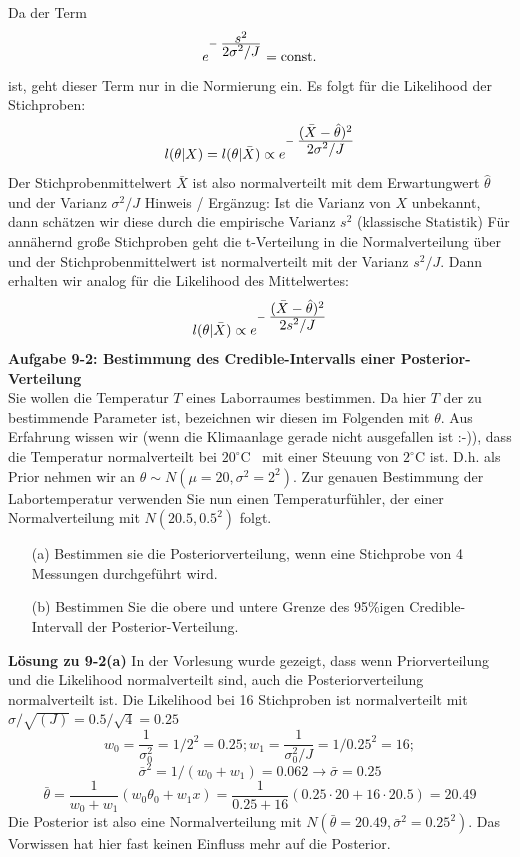 Da der Term
\[e^{-\;\frac{\textstyle s^2 }
	{\textstyle 2 \sigma^2/J}} = \mathrm{const.}
\]
ist, geht dieser Term nur in die Normierung ein.
Es folgt für die Likelihood der Stichproben:
\[
l(\theta|X) = l(\theta|\bar{X}) \propto e^{-\;\frac{\textstyle (\bar{X} - \hat{\theta})^2}
	{\textstyle 2 \sigma^2/J}}
\]
Der Stichprobenmittelwert $\bar{X}$ ist also normalverteilt mit dem
Erwartungwert $\hat{\theta}$ und der Varianz $\sigma^2 /J$
Hinweis / Ergänzug: Ist die Varianz von $X$ unbekannt, dann schätzen wir diese durch die empirische Varianz $s^2$ (klassische Statistik) Für annähernd große Stichproben geht die t-Verteilung in
die Normalverteilung über und der Stichprobenmittelwert ist normalverteilt mit der Varianz $s^2/J$. Dann erhalten wir analog für die Likelihood des Mittelwertes:
\[
l(\theta|\bar{X}) \propto e^{-\;\frac{\textstyle (\bar{X} - \hat{\theta})^2}
	{\textstyle 2 s^2/J}}
\]
\textbf{Aufgabe 9-2: Bestimmung des Credible-Intervalls einer Posterior-Verteilung} \\
Sie wollen die Temperatur $T$ eines Laborraumes bestimmen.
Da hier $T$ der zu bestimmende Parameter ist, bezeichnen
wir diesen im Folgenden mit $\theta$.
Aus Erfahrung wissen wir (wenn die Klimaanlage gerade nicht ausgefallen ist :-)), dass die Temperatur normalverteilt bei $20^{\circ}\textrm{C}$ \
 mit einer Steuung von $2^{\circ}\textrm{C}$ ist. D.h. als Prior nehmen wir an
$\theta \sim N(\mu=20,\sigma^2=2^2)$. Zur genauen Bestimmung der
Labortemperatur verwenden Sie nun einen Temperaturfühler, der einer
Normalverteilung mit $N(20.5,0.5^2)$ folgt.

\begin{itemize}
   \item[(a)] Bestimmen sie die Posteriorverteilung, wenn eine
   Stichprobe von 4 Messungen durchgeführt wird.
   \item[(b)] Bestimmen Sie die obere und untere Grenze des 95\%igen Credible-Intervall der Posterior-Verteilung.
\end{itemize}

\textbf{Lösung zu 9-2(a)}
In der Vorlesung wurde gezeigt, dass wenn Priorverteilung und
die Likelihood normalverteilt sind, auch die Posteriorverteilung
normalverteilt ist.
Die Likelihood bei 16 Stichproben ist normalverteilt mit
$\sigma/\sqrt{(J)} = 0.5 / \sqrt{4} = 0.25 $
\[
w_0 = \frac{1}{\sigma_0^2} = 1/2^2 = 0.25;
w_1 = \frac{1}{\sigma_0^2/J} = 1/0.25^2 = 16;
\]
\[
\bar{\sigma}^2 = 1/(w_0 + w_1) = 0.062 \rightarrow
\bar{\sigma} = 0.25
\]
\[
\bar{\theta} = \frac{1}{w_0 + w_1} (w_0\theta_0 + w_1 x) =
\frac{1}{0.25 + 16} (0.25 \cdot 20 + 16 \cdot 20.5) = 20.49
\]
Die Posterior ist also eine Normalverteilung mit
$N(\bar{\theta} =20.49,\bar{\sigma}^2 = 0.25^2)$.
Das Vorwissen hat hier fast keinen Einfluss mehr auf die Posterior.

